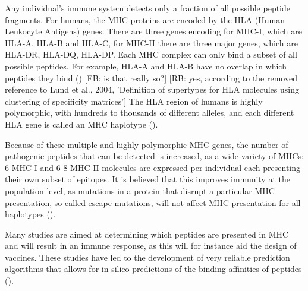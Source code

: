 
Any individual's immune system detects only a fraction of all possible
peptide fragments.
For humans, the MHC proteins are encoded by the
HLA (Human Leukocyte Antigens) genes.
There are three genes encoding for MHC-I, which are HLA-A, HLA-B and HLA-C,
for MHC-II there are three major genes, which are HLA-DR, HLA-DQ, HLA-DP.
Each MHC complex can only bind a subset of all possible peptides.
For example, HLA-A and HLA-B have no overlap in which
peptides they bind (\cite{lund2004definition})
[FB: is that really so?]
[RB: yes, according to the removed reference to Lund et al., 2004, 'Definition of supertypes for {HLA} molecules using clustering of specificity matrices'] 
The HLA region of humans is highly polymorphic, with hundreds 
to thousands of different alleles, 
and each different HLA gene is called 
an MHC haplotype (\cite{marsh2010nomenclature}).


Because of these multiple and highly polymorphic MHC genes,
the number of pathogenic peptides that can be detected is increased,
as a wide variety of MHCs: 
6 MHC-I and 6-8 MHC-II molecules are expressed per individual
each presenting their own subset of epitopes.
It is believed that this improves immunity at the population level, 
as mutations in a protein that disrupt a particular MHC presentation, 
so-called escape mutations, 
will not affect MHC presentation for all haplotypes (\cite{sommer2005importance}).


Many studies are aimed at determining which peptides are presented in MHC 
and will result in an immune response, 
as this will for instance aid the design of vaccines. 
These studies have led to the development 
of very reliable prediction algorithms 
that allows for in silico predictions 
of the binding affinities of peptides (\cite{larsen2010identification,schellens2008unanticipated,tang2011genome}).
 
